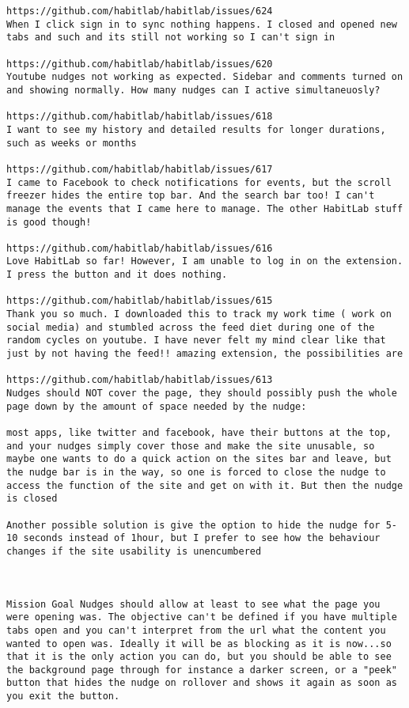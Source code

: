 \begin{lstlisting}[breaklines]
https://github.com/habitlab/habitlab/issues/624
When I click sign in to sync nothing happens. I closed and opened new tabs and such and its still not working so I can't sign in

https://github.com/habitlab/habitlab/issues/620
Youtube nudges not working as expected. Sidebar and comments turned on and showing normally. How many nudges can I active simultaneuosly?

https://github.com/habitlab/habitlab/issues/618
I want to see my history and detailed results for longer durations, such as weeks or months

https://github.com/habitlab/habitlab/issues/617
I came to Facebook to check notifications for events, but the scroll freezer hides the entire top bar. And the search bar too! I can't manage the events that I came here to manage. The other HabitLab stuff is good though!

https://github.com/habitlab/habitlab/issues/616
Love HabitLab so far! However, I am unable to log in on the extension. I press the button and it does nothing.

https://github.com/habitlab/habitlab/issues/615
Thank you so much. I downloaded this to track my work time ( work on social media) and stumbled across the feed diet during one of the random cycles on youtube. I have never felt my mind clear like that just by not having the feed!! amazing extension, the possibilities are

https://github.com/habitlab/habitlab/issues/613
Nudges should NOT cover the page, they should possibly push the whole page down by the amount of space needed by the nudge: 

most apps, like twitter and facebook, have their buttons at the top, and your nudges simply cover those and make the site unusable, so maybe one wants to do a quick action on the sites bar and leave, but the nudge bar is in the way, so one is forced to close the nudge to access the function of the site and get on with it. But then the nudge is closed

Another possible solution is give the option to hide the nudge for 5-10 seconds instead of 1hour, but I prefer to see how the behaviour changes if the site usability is unencumbered



Mission Goal Nudges should allow at least to see what the page you were opening was. The objective can't be defined if you have multiple tabs open and you can't interpret from the url what the content you wanted to open was. Ideally it will be as blocking as it is now...so that it is the only action you can do, but you should be able to see the background page through for instance a darker screen, or a "peek" button that hides the nudge on rollover and shows it again as soon as you exit the button.


\end{lstlisting}
